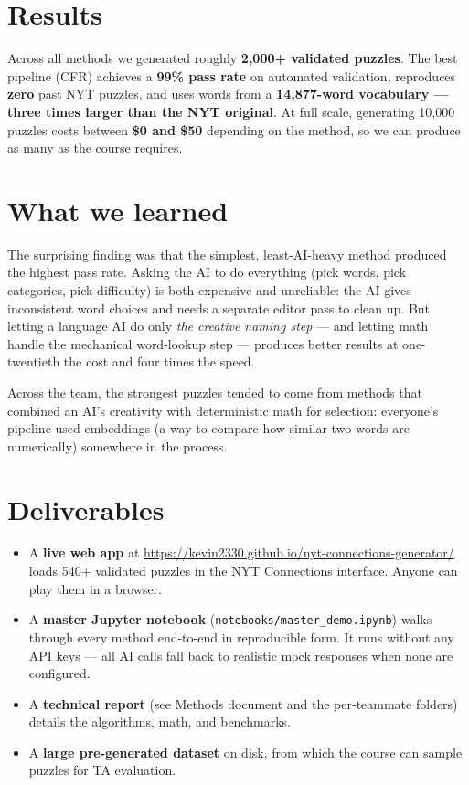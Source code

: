 \documentclass[11pt, letterpaper]{article}
\begin{document}
\section*{Results}

\begin{keybox}
Across all methods we generated roughly \textbf{2{,}000+ validated puzzles}.
The best pipeline (CFR) achieves a \textbf{99\% pass rate} on automated
validation, reproduces \textbf{zero} past NYT puzzles, and uses words from
a \textbf{14{,}877-word vocabulary --- three times larger than the NYT
original}. At full scale, generating 10{,}000 puzzles costs between
\textbf{\$0 and \$50} depending on the method, so we can produce as many as
the course requires.
\end{keybox}

\section*{What we learned}

The surprising finding was that the simplest, least-AI-heavy method produced
the highest pass rate. Asking the AI to do everything (pick words, pick
categories, pick difficulty) is both expensive and unreliable: the AI gives
inconsistent word choices and needs a separate editor pass to clean up. But
letting a language AI do only \emph{the creative naming step} --- and letting
math handle the mechanical word-lookup step --- produces better results at
one-twentieth the cost and four times the speed.

Across the team, the strongest puzzles tended to come from methods that
combined an AI's creativity with deterministic math for selection: everyone's
pipeline used embeddings (a way to compare how similar two words are
numerically) somewhere in the process.

\section*{Deliverables}

\begin{itemize}[leftmargin=*, itemsep=0.15em]
\item A \textbf{live web app} at
\url{https://kevin2330.github.io/nyt-connections-generator/}
loads 540+ validated puzzles in the NYT Connections interface. Anyone can play
them in a browser.
\item A \textbf{master Jupyter notebook} (\texttt{notebooks/master\_demo.ipynb})
walks through every method end-to-end in reproducible form. It runs without
any API keys --- all AI calls fall back to realistic mock responses when none
are configured.
\item A \textbf{technical report} (see Methods document and the per-teammate
folders) details the algorithms, math, and benchmarks.
\item A \textbf{large pre-generated dataset} on disk, from which the course can
sample puzzles for TA evaluation.
\end{itemize}
\end{document}
